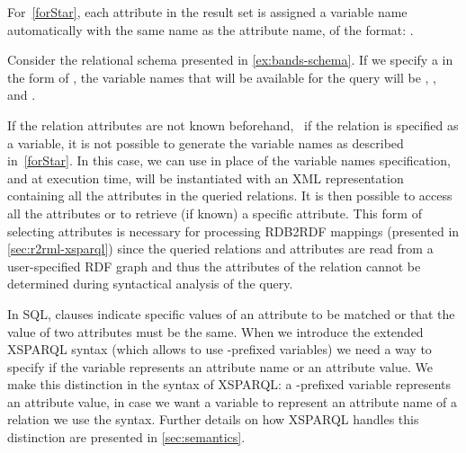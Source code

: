 %
For~\ref{forStar}, each attribute in the result set is assigned a variable name automatically with the same name as the
attribute name, of the format: .
%
\begin{example}
  Consider the relational schema presented in \cref{ex:bands-schema}.
  If we specify a \SQLForClause in the form of , the variable names that will be available for
  the query will be , , and .
\end{example}

If the relation attributes are not known beforehand, \eg~if the relation is specified as a variable, it is not possible
to generate the variable names as described in~\ref{forStar}.
%
In this case, we can use  in place of the variable names specification, and at execution time, 
will be instantiated with an \ac{XML} representation containing all the attributes in the queried relations.
%
It is then possible to access all the attributes or to retrieve (if known) a specific attribute.
%
This form of selecting attributes is necessary for processing RDB2RDF mappings (presented in \cref{sec:r2rml-xsparql})
since the queried relations and attributes are read from a user-specified \ac{RDF} graph and thus the attributes of the
relation cannot be determined during syntactical analysis of the query.

In \ac{SQL}, \WHERE clauses indicate specific values of an attribute to be matched or that the value of two attributes
must be the same.  When we introduce the extended XSPARQL syntax (which allows to use \var{}-prefixed variables) we need
a way to specify if the variable represents an attribute name or an attribute value.  We make this distinction in the
syntax of XSPARQL: a \var{}-prefixed variable represents an attribute value, in case we want a variable to represent an
attribute name of a relation we use the \lit{\textbraceleft}  \lit{\textbraceright} syntax.  Further
details on how XSPARQL handles this distinction are presented in \cref{sec:semantics}.

